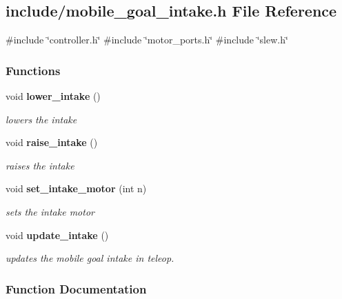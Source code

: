 \subsection{include/mobile\+\_\+goal\+\_\+intake.h File Reference}
\label{a00047}
{\ttfamily \#include \char`\"{}controller.\+h\char`\"{}}\newline
{\ttfamily \#include \char`\"{}motor\+\_\+ports.\+h\char`\"{}}\newline
{\ttfamily \#include \char`\"{}slew.\+h\char`\"{}}\newline
\subsubsection*{Functions}
\begin{DoxyCompactItemize}
\item 
void \textbf{ lower\+\_\+intake} ()
\begin{DoxyCompactList}\small\item\em lowers the intake \end{DoxyCompactList}\item 
void \textbf{ raise\+\_\+intake} ()
\begin{DoxyCompactList}\small\item\em raises the intake \end{DoxyCompactList}\item 
void \textbf{ set\+\_\+intake\+\_\+motor} (int n)
\begin{DoxyCompactList}\small\item\em sets the intake motor \end{DoxyCompactList}\item 
void \textbf{ update\+\_\+intake} ()
\begin{DoxyCompactList}\small\item\em updates the mobile goal intake in teleop. \end{DoxyCompactList}\end{DoxyCompactItemize}


\subsubsection{Function Documentation}
\mbox{\label{a00047_aef03134014e51a6a90dd3824f09f4d6c}} 
